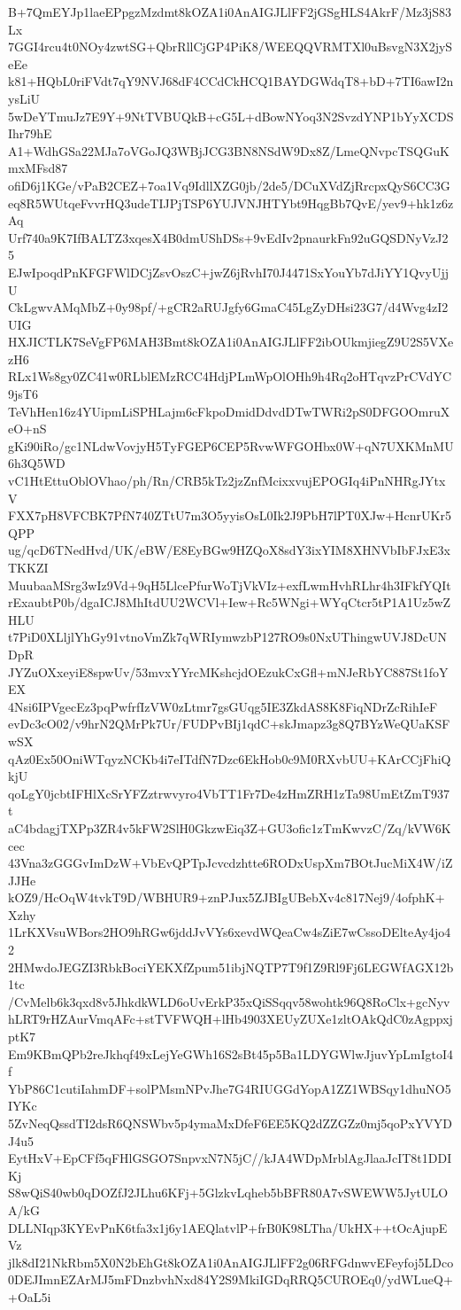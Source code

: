 B+7QmEYJp1laeEPpgzMzdmt8kOZA1i0AnAIGJLlFF2jGSgHLS4AkrF/Mz3jS83Lx
7GGI4rcu4t0NOy4zwtSG+QbrRllCjGP4PiK8/WEEQQVRMTXl0uBsvgN3X2jySeEe
k81+HQbL0riFVdt7qY9NVJ68dF4CCdCkHCQ1BAYDGWdqT8+bD+7TI6awI2nysLiU
5wDeYTmuJz7E9Y+9NtTVBUQkB+cG5L+dBowNYoq3N2SvzdYNP1bYyXCDSIhr79hE
A1+WdhGSa22MJa7oVGoJQ3WBjJCG3BN8NSdW9Dx8Z/LmeQNvpcTSQGuKmxMFsd87
ofiD6j1KGe/vPaB2CEZ+7oa1Vq9IdllXZG0jb/2de5/DCuXVdZjRrcpxQyS6CC3G
eq8R5WUtqeFvvrHQ3udeTIJPjTSP6YUJVNJHTYbt9HqgBb7QvE/yev9+hk1z6zAq
Urf740a9K7IfBALTZ3xqesX4B0dmUShDSs+9vEdIv2pnaurkFn92uGQSDNyVzJ25
EJwIpoqdPnKFGFWlDCjZsvOszC+jwZ6jRvhI70J4471SxYouYb7dJiYY1QvyUjjU
CkLgwvAMqMbZ+0y98pf/+gCR2aRUJgfy6GmaC45LgZyDHsi23G7/d4Wvg4zI2UIG
HXJICTLK7SeVgFP6MAH3Bmt8kOZA1i0AnAIGJLlFF2ibOUkmjiegZ9U2S5VXezH6
RLx1Ws8gy0ZC41w0RLblEMzRCC4HdjPLmWpOlOHh9h4Rq2oHTqvzPrCVdYC9jsT6
TeVhHen16z4YUipmLiSPHLajm6cFkpoDmidDdvdDTwTWRi2pS0DFGOOmruXeO+nS
gKi90iRo/gc1NLdwVovjyH5TyFGEP6CEP5RvwWFGOHbx0W+qN7UXKMnMU6h3Q5WD
vC1HtEttuOblOVhao/ph/Rn/CRB5kTz2jzZnfMcixxvujEPOGIq4iPnNHRgJYtxV
FXX7pH8VFCBK7PfN740ZTtU7m3O5yyisOsL0Ik2J9PbH7lPT0XJw+HcnrUKr5QPP
ug/qcD6TNedHvd/UK/eBW/E8EyBGw9HZQoX8sdY3ixYIM8XHNVbIbFJxE3xTKKZI
MuubaaMSrg3wIz9Vd+9qH5LlcePfurWoTjVkVIz+exfLwmHvhRLhr4h3IFkfYQIt
rExaubtP0b/dgaICJ8MhItdUU2WCVl+Iew+Rc5WNgi+WYqCtcr5tP1A1Uz5wZHLU
t7PiD0XLljlYhGy91vtnoVmZk7qWRIymwzbP127RO9s0NxUThingwUVJ8DcUNDpR
JYZuOXxeyiE8spwUv/53mvxYYrcMKshcjdOEzukCxGfl+mNJeRbYC887St1foYEX
4Nsi6IPVgecEz3pqPwfrfIzVW0zLtmr7gsGUqg5IE3ZkdAS8K8FiqNDrZcRihIeF
evDc3cO02/v9hrN2QMrPk7Ur/FUDPvBIj1qdC+skJmapz3g8Q7BYzWeQUaKSFwSX
qAz0Ex50OniWTqyzNCKb4i7eITdfN7Dzc6EkHob0c9M0RXvbUU+KArCCjFhiQkjU
qoLgY0jcbtIFHlXcSrYFZztrwvyro4VbTT1Fr7De4zHmZRH1zTa98UmEtZmT937t
aC4bdagjTXPp3ZR4v5kFW2SlH0GkzwEiq3Z+GU3ofic1zTmKwvzC/Zq/kVW6Kcec
43Vna3zGGGvImDzW+VbEvQPTpJcvcdzhtte6RODxUspXm7BOtJucMiX4W/iZJJHe
kOZ9/HcOqW4tvkT9D/WBHUR9+znPJux5ZJBIgUBebXv4c817Nej9/4ofphK+Xzhy
1LrKXVsuWBors2HO9hRGw6jddJvVYs6xevdWQeaCw4sZiE7wCssoDElteAy4jo42
2HMwdoJEGZI3RbkBociYEKXfZpum51ibjNQTP7T9f1Z9Rl9Fj6LEGWfAGX12b1tc
/CvMelb6k3qxd8v5JhkdkWLD6oUvErkP35xQiSSqqv58wohtk96Q8RoClx+gcNyv
hLRT9rHZAurVmqAFc+stTVFWQH+lHb4903XEUyZUXe1zltOAkQdC0zAgppxjptK7
Em9KBmQPb2reJkhqf49xLejYeGWh16S2sBt45p5Ba1LDYGWlwJjuvYpLmIgtoI4f
YbP86C1cutiIahmDF+solPMsmNPvJhe7G4RIUGGdYopA1ZZ1WBSqy1dhuNO5IYKc
5ZvNeqQssdTI2dsR6QNSWbv5p4ymaMxDfeF6EE5KQ2dZZGZz0mj5qoPxYVYDJ4u5
EytHxV+EpCFf5qFHlGSGO7SnpvxN7N5jC//kJA4WDpMrblAgJlaaJcIT8t1DDIKj
S8wQiS40wb0qDOZfJ2JLhu6KFj+5GlzkvLqheb5bBFR80A7vSWEWW5JytULOA/kG
DLLNIqp3KYEvPnK6tfa3x1j6y1AEQlatvlP+frB0K98LTha/UkHX++tOcAjupEVz
jlk8dI21NkRbm5X0N2bEhGt8kOZA1i0AnAIGJLlFF2g06RFGdnwvEFeyfoj5LDco
0DEJImnEZArMJ5mFDnzbvhNxd84Y2S9MkiIGDqRRQ5CUROEq0/ydWLueQ++OaL5i
